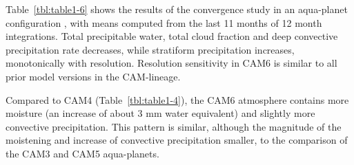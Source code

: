 Table~\ref{tbl:table1-6} shows the results of the convergence study in an aqua-planet configuration \citep[`QOBS' SST profile in][]{NH2000ASL}, with means computed from the last 11 months of 12 month integrations. Total precipitable water, total cloud fraction and deep convective precipitation rate decreases, while stratiform precipitation increases, monotonically with resolution. Resolution sensitivity in CAM6 is similar to all prior model versions in the CAM-lineage. 

Compared to CAM4 (Table~\ref{tbl:table1-4}), the CAM6 atmosphere contains more moisture (an increase of about 3 mm water equivalent) and slightly more convective precipitation. This pattern is similar, although the magnitude of the moistening and increase of convective precipitation smaller, to the comparison of the CAM3 and CAM5 aqua-planets.

